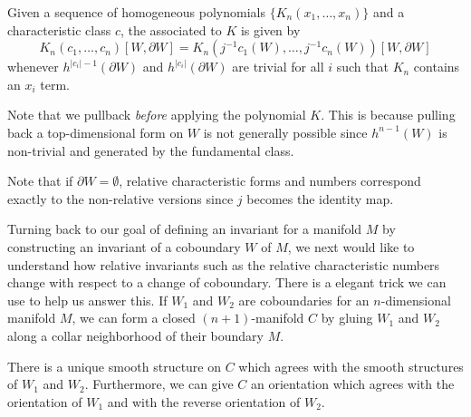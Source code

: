 \begin{definition}\label{defn:relative-characteristic-number-polynomial}
	Given a sequence of homogeneous polynomials $\{K_n(x_1,\ldots, x_n)\}$ and a characteristic class $c$, the  associated to $K$ is given by
	\[
		K_n(c_1, \ldots, c_n)[W,\partial W] = K_n(j^{-1}c_1(W), \ldots, j^{-1}c_n(W))[W,\partial W]
	\]
	whenever $h^{|c_i|-1}(\partial W)$ and $h^{|c_i|}(\partial W)$ are trivial for all $i$ such that $K_n$ contains an $x_i$ term.
\end{definition}

\begin{remark*}
	Note that we pullback \emph{before} applying the polynomial $K$. This is because pulling back a top-dimensional form on $W$ is not generally possible since $h^{n-1}(W)$ is non-trivial and generated by the fundamental class.
\end{remark*}

\begin{remark*}
	Note that if $\partial W=\emptyset$, relative characteristic forms and numbers correspond exactly to the non-relative versions since $j$ becomes the identity map.
\end{remark*}

Turning back to our goal of defining an invariant for a manifold $M$ by constructing an invariant of a coboundary $W$ of $M$, we next would like to understand how relative invariants such as the relative characteristic numbers change with respect to a change of coboundary.
There is a elegant trick we can use to help us answer this. If $W_1$ and $W_2$ are coboundaries for an $n$-dimensional manifold $M$, we can form a closed $(n+1)$-manifold $C$ by gluing $W_1$ and $W_2$ along a collar neighborhood of their boundary $M$.

\begin{proposition}
	There is a unique smooth structure on $C$ which agrees with the smooth structures of $W_1$ and $W_2$. Furthermore, we can give $C$ an orientation which agrees with the orientation of $W_1$ and with the reverse orientation of $W_2$.
\end{proposition}

